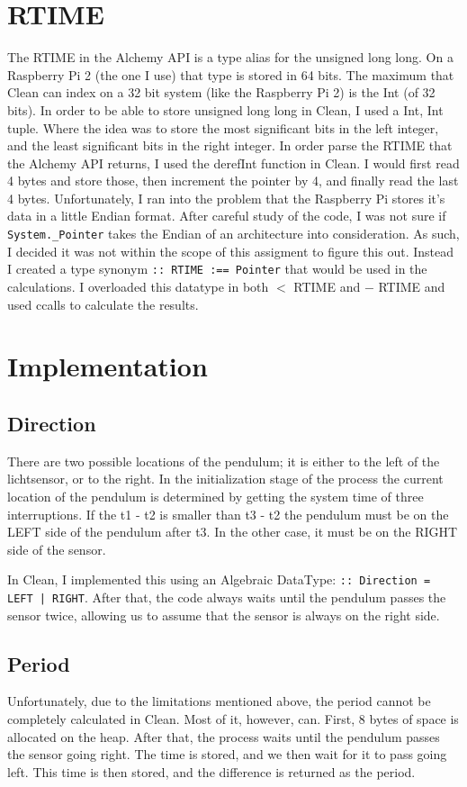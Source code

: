 \documentclass{scrartcl}
\begin{document}
\section{RTIME}
The RTIME in the Alchemy API is a type alias for the unsigned long long.
On a Raspberry Pi 2 (the one I use) that type is stored in 64 bits.
The maximum that Clean can index on a 32 bit system (like the Raspberry Pi 2) is the Int (of 32 bits).
In order to be able to store unsigned long long in Clean, I used a Int, Int tuple.
Where the idea was to store the most significant bits in the left integer, and the least significant bits in the right integer.
In order parse the RTIME that the Alchemy API returns, I used the derefInt function in Clean.
I would first read 4 bytes and store those, then increment the pointer by 4, and finally read the last 4 bytes.
Unfortunately, I ran into the problem that the Raspberry Pi stores it's data in a little Endian format.
After careful study of the code, I was not sure if \texttt{System._Pointer} takes the Endian of an architecture into consideration.
As such, I decided it was not within the scope of this assigment to figure this out.
Instead I created a type synonym \texttt{:: RTIME :== Pointer} that would be used in the calculations.
I overloaded this datatype in both $<$ RTIME and $-$ RTIME and used ccalls to calculate the results.

\section{Implementation}
\subsection{Direction}
There are two possible locations of the pendulum; it is either to the left of the lichtsensor, or to the right.
In the initialization stage of the process the current location of the pendulum is determined by getting the system time of three interruptions.
If the t1 - t2 is smaller than t3 - t2 the pendulum must be on the LEFT side of the pendulum after t3.
In the other case, it must be on the RIGHT side of the sensor.

In Clean, I implemented this using an Algebraic DataType: \texttt{:: Direction = LEFT | RIGHT}.
After that, the code always waits until the pendulum passes the sensor twice, allowing us to assume that the sensor is always on the right side.

\subsection{Period}
Unfortunately, due to the limitations mentioned above, the period cannot be completely calculated in Clean.
Most of it, however, can.
First, 8 bytes of space is allocated on the heap.
After that, the process waits until the pendulum passes the sensor going right.
The time is stored, and we then wait for it to pass going left.
This time is then stored, and the difference is returned as the period.
\end{document}
